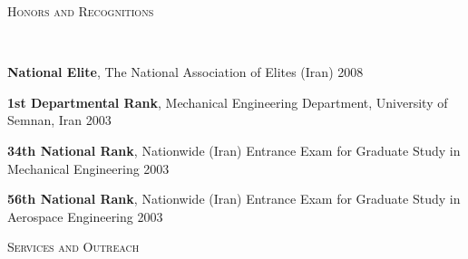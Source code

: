 \documentclass[10pt]{article}
\newenvironment{changemargin}[2]{%
  \begin{list}{}{%
    \setlength{\topsep}{0pt}%
    \setlength{\leftmargin}{#1}%
    \setlength{\rightmargin}{#2}%
    \setlength{\listparindent}{\parindent}%
    \setlength{\itemindent}{\parindent}%
    \setlength{\parsep}{\parskip}%
  }%
  \item[]}{\end{list}
}
\newcommand{\lineover}{
	\begin{changemargin}{-0.05in}{-0.05in}
		\vspace*{-8pt}
		\hrulefill \\
		\vspace*{-2pt}
	\end{changemargin}
}
\newcommand{\header}[1]{
	\begin{changemargin}{-0.5in}{-0.5in}
		\scshape{#1}\\
  	\lineover
	\end{changemargin}
}
\newenvironment{body} {
	\vspace*{-2pt}
	\begin{changemargin}{-0.5in}{-0.5in}
  }
	{\end{changemargin}
}
\begin{document}
\header{Honors and Recognitions}

\begin{body}

	\textbf{National Elite}, The National Association of Elites (Iran) \hfill {2008}\\ \medskip

	\textbf{1st Departmental Rank}, Mechanical Engineering Department, University of Semnan, Iran \hfill {2003}\\ \medskip

	\textbf{34th National Rank}, Nationwide (Iran) Entrance Exam for Graduate Study in Mechanical Engineering \hfill {2003}\\ \medskip

	\textbf{56th National Rank}, Nationwide (Iran) Entrance Exam for Graduate Study in Aerospace Engineering \hfill {2003}\\ \medskip

\end{body}
\medskip

\header{Services and Outreach}
\end{document}
